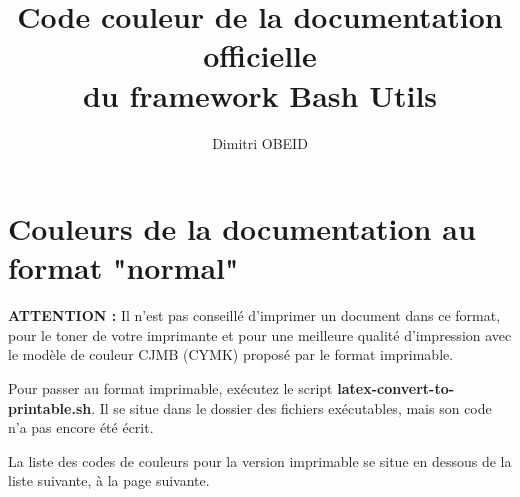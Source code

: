 \documentclass[a4paper,10pt]{article}
\title{\color{sec1}Code couleur de la documentation officielle \\du framework Bash Utils}\color{text}
\author{Dimitri OBEID}
\begin{document}
\maketitle

\color{sec1}
\section{Couleurs de la documentation au format "normal"}\color{text}

\begin{justify}
  \textbf{\color{case}ATTENTION :} Il n'est pas conseillé d'imprimer un document dans ce format, pour le toner de votre imprimante et pour une meilleure qualité d'impression avec le modèle de couleur CJMB (CYMK) proposé par le format imprimable.

  Pour passer au format imprimable, exécutez le script \textbf{\color{cmds}latex-convert-to-printable.sh}. Il se situe dans le dossier des fichiers exécutables, mais son code n'a pas encore été écrit.
\end{justify}

\begin{justify}
  La liste des codes de couleurs pour la version imprimable se situe en dessous de la liste suivante, à la page suivante.
\end{justify}
\end{document}
